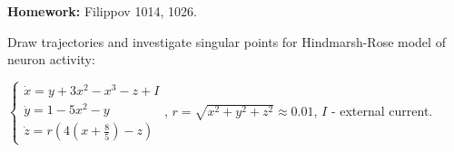 \documentclass[14pt]{exam}
\begin{document}
	\textbf{Homework:} Filippov 1014, 1026.
	
	Draw trajectories and investigate singular points for Hindmarsh-Rose model of neuron activity:
	
	$
	\begin{cases}
		\dot{x} = y + 3x^2 - x^3 - z + I\\
		\dot{y} = 1 - 5x^2 - y\\
		\dot{z} = r(4(x + \frac{8}{5}) - z)
	\end{cases}
	$, $r = \sqrt{x^2 + y^2 + z^2} \approx 0.01$, $I$ - external current.
\end{document}
